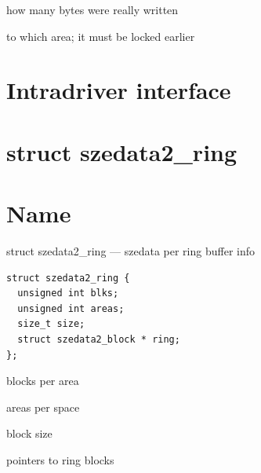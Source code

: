 \label{id206797}

\begin{kdocdescription}
\item[{size}]
how many bytes were really written
\item[{area}]
to which area; it must be locked earlier
\end{kdocdescription}
\noindent 
\section{Intradriver interface}
\label{id244787}\hypertarget{id244787}{}%
% 
\section*{struct szedata2\_ring}
\label{API-struct-szedata2-ring}\hypertarget{API-struct-szedata2-ring}{}%
\label{id244829}

\section*{Name}
struct szedata2\_ring --- szedata per ring buffer info\label{id244839}

\begin{Verbatim}[]
struct szedata2_ring {
  unsigned int blks;
  unsigned int areas;
  size_t size;
  struct szedata2_block * ring;
};  
\end{Verbatim}

\label{id244852}

\begin{kdocdescription}
\item[{blks}]
blocks per area
\item[{areas}]
areas per space
\item[{size}]
block size
\item[{ring}]
pointers to ring blocks
\end{kdocdescription}
\noindent 
